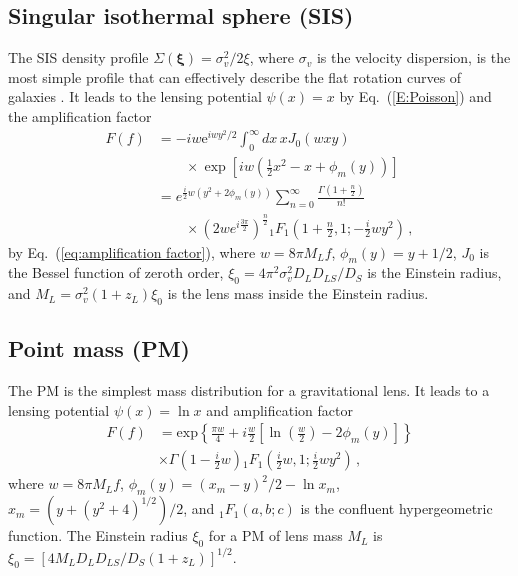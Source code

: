 \documentclass[floats,floatfix,showpacs,amssymb,prd,twocolumn,superscriptaddress,nofootinbib,nolongbibliography,reprint]{revtex4-2}
\begin{document}
\subsection{\label{subsec:Singular Isothermal Sphere lens}Singular isothermal sphere (SIS)}

The SIS density profile $\Sigma(\boldsymbol{\xi}) = \sigma_v^2/2\xi$, where $\sigma_v$ is the velocity dispersion, is the most simple profile that can effectively describe the flat rotation curves of galaxies \cite{Gavazzi_2007}. It leads to the lensing potential $\psi(x) = x$ by Eq.~(\ref{E:Poisson}) and the amplification factor \cite{Takahashi_2003,Matsunaga_2006}
\begin{align}
    F(f) &= -iw\text{e}^{iwy^2/2} \int_0^\infty dx\,x J_0(wxy) \nonumber \\
    & \quad \quad \times \exp \left[iw \left(\frac{1}{2}x^2 -x +\phi_m(y) \right) \right]
    \nonumber \\
    &= e^{\frac{i}{2}w(y^2 + 2\phi_m(y))} \sum_{n=0}^\infty \frac{\Gamma(1 + \frac{n}{2})}{n!} \nonumber \\
    & \quad \quad \times (2we^{i\frac{3 \pi}{2}})^\frac{n}{2} {}_{1}F_1 \left(1 + \frac{n}{2}, 1; -\frac{i}{2}w y^2\right)\,, \label{eq: amp factor sis analytical}
\end{align}
by Eq.~(\ref{eq:amplification factor}), where $w = 8\pi M_L f$, $\phi_m(y) = y + 1/2$, $J_0$ is the Bessel function of zeroth order, $\xi_0 = 4\pi^2\sigma_v^2D_{L}D_{LS}/D_S$ is the Einstein radius, and $M_L = \sigma_v^2(1+z_L)\xi_0$ is the lens mass inside the Einstein radius.

\subsection{\label{subsec: Point mass lens}Point mass (PM)}

The PM is the simplest mass distribution for a gravitational lens. It leads to a lensing potential $\psi(x) = \ln x$ and amplification factor \cite{PhysRevD.9.2207, Takahashi_2003}
\begin{align}\label{eq: amp factor pm}
    F(f) &= \text{exp} \left\{ \frac{\pi w}{4} + i \frac{w}{2} \left[\ln\left(\frac{w}{2}\right) - 2 \phi_m(y) \right]  \right\} \nonumber \\& \times  \Gamma \left(1 - \frac{i}{2}w \right) {}_{1}F_1 \left(\frac{i}{2}w, 1; \frac{i}{2}w y^2\right)\,,
\end{align}
where $w = 8 \pi M_L f$, $\phi_m(y) = (x_m - y)^2/2 - \ln x_m$, $x_m = (y + (y^2 + 4)^{1/2})/2$, and ${}_{1}F_1(a, b; c)$ is the confluent hypergeometric function. The Einstein radius $\xi_0$ for a PM of lens mass $M_L$ is $\xi_0 = [4M_LD_L D_{LS}/D_S(1 + z_L)]^{1/2}$.
\end{document}
